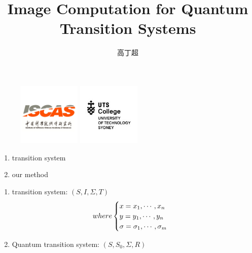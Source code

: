 \documentclass[aspectratio=1610,18pt]{ctexbeamer}
\title[TDD in quantum]{Image Computation for Quantum Transition Systems}
\author{高丁超}
\begin{document}
\begin{frame}[plain]
  \titlepage
  \begin{figure}
    \centering
    \begin{minipage}[t]{0.48\textwidth}
    \centering
    \includegraphics[width=3cm]{iscas.png}
    \end{minipage}
    \begin{minipage}[t]{0.48\textwidth}
    \centering
    \includegraphics[width=3cm]{uts.jpg}
    \end{minipage}
  \end{figure}
\end{frame}
\begin{frame}
  \begin{enumerate}
    \Large
    \item transition system
    \item our method
  \end{enumerate}
\end{frame}
\begin{frame}
  \begin{enumerate}
    \Large
    \item  transition system: $(S, I, \Sigma, T)$
    \begin{equation}
      where
      \begin{cases}
        x = x_1, \cdots, x_n\\
        y = y_1, \cdots, y_n\\
        \sigma = \sigma_1, \cdots, \sigma_m
      \end{cases}
      \notag
    \end{equation}
    \item Quantum transition system: $(S, S_0, \Sigma, R)$
  \end{enumerate}
\end{frame}
\end{document}
